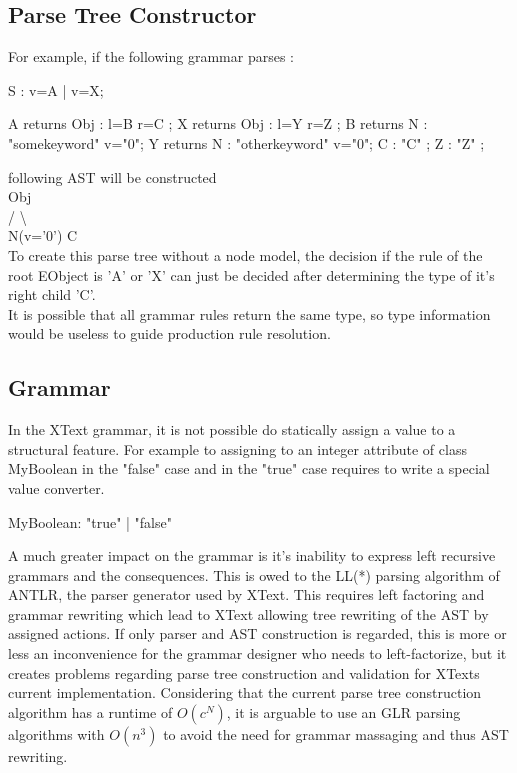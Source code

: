 \subsection{Parse Tree Constructor} \label{sub:Xtxt:PTC}

For example, if the following grammar parses :
\begin{xtxt}
S  	:  	v=A 
	| 	v=X;

A returns Obj	: 	l=B r=C   ;
X returns Obj	: 	l=Y r=Z   ;
B returns N  	:  	"somekeyword" 	v="0";
Y returns N  	: 	"otherkeyword" 	v="0";
C 		:  	 "C" ;
Z 		: 	 "Z" ;
\end{xtxt}
following AST will be constructed  \\ 
      Obj			\\
     /   \textbackslash		\\
N(v='0')   C	\\
To create this parse tree without a node model, the decision if the rule of the root EObject is 'A' or 'X' can just be decided after determining the type of it's right child 'C'.  \\

It is possible that all grammar rules return the same type, so type information would be useless to guide production rule resolution.\\


\subsection{Grammar}
In the XText grammar, it is not possible do statically assign a value  to a structural feature. For example to assigning  to an integer attribute  of class MyBoolean in the "false" case and  in the "true" case requires to write a special value converter. 
\begin{xtxt}
MyBoolean:  "true" | "false"
\end{xtxt}

A much greater impact on the grammar is it's inability to express left recursive grammars and the consequences. This is owed to the LL(*) parsing algorithm of ANTLR, the parser generator used by XText. This requires left factoring and grammar rewriting which lead to XText allowing tree rewriting of the AST by assigned actions. If only parser and AST construction is regarded, this is more or less an inconvenience for the grammar designer who needs to left-factorize, but it creates problems regarding parse tree construction and validation for XTexts current implementation. Considering that the current parse tree construction algorithm has a runtime of $O(c^N)$, it is arguable to use an GLR parsing algorithms with  $O(n^3)$ to avoid the need for grammar massaging and thus AST rewriting.

